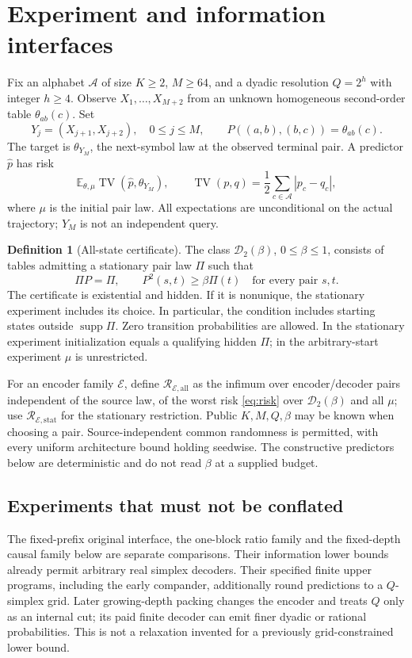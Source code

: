 \documentclass[11pt,letterpaper]{article}
\theoremstyle{definition}\newtheorem{definition}[theorem]{Definition}
\theoremstyle{remark}\newtheorem{remark}[theorem]{Remark}
\newcommand{\TV}{\operatorname{TV}}
\newcommand{\E}{\mathbb{E}}
\newcommand{\Risk}{\mathcal{R}}
\newcommand{\Dclass}{\mathcal{D}_2(\beta)}
\newcommand{\supp}{\operatorname{supp}}
\begin{document}
\section{Experiment and information interfaces}\label{sec:experiment}
Fix an alphabet $\mathcal A$ of size $K\ge2$, $M\ge64$, and a dyadic resolution $Q=2^h$ with integer $h\ge4$. Observe $X_1,\ldots,X_{M+2}$ from an unknown homogeneous second-order table $\theta_{ab}(c)$. Set
\[
 Y_j=(X_{j+1},X_{j+2}),\quad 0\le j\le M,
 \qquad P((a,b),(b,c))=\theta_{ab}(c).
\]
The target is $\theta_{Y_M}$, the next-symbol law at the observed terminal pair. A predictor $\widehat p$ has risk
\begin{equation}\label{eq:risk}
 \E_{\theta,\mu}\TV(\widehat p,\theta_{Y_M}),
 \qquad \TV(p,q)=\frac12\sum_{c\in\mathcal A}|p_c-q_c|,
\end{equation}
where $\mu$ is the initial pair law. All expectations are unconditional on the actual trajectory; $Y_M$ is not an independent query.

\begin{definition}[All-state certificate]
The class $\Dclass$, $0\le\beta\le1$, consists of tables admitting a stationary pair law $\Pi$ such that
\begin{equation}\label{eq:minor}
 \Pi P=\Pi,\qquad P^2(s,t)\ge\beta\Pi(t)\quad\text{for every pair }s,t.
\end{equation}
The certificate is existential and hidden. If it is nonunique, the stationary experiment includes its choice. In particular, the condition includes starting states outside $\supp\Pi$. Zero transition probabilities are allowed. In the stationary experiment initialization equals a qualifying hidden $\Pi$; in the arbitrary-start experiment $\mu$ is unrestricted.
\end{definition}

For an encoder family $\mathcal E$, define $\Risk_{\mathcal E,\mathrm{all}}$ as the infimum over encoder/decoder pairs independent of the source law, of the worst risk \eqref{eq:risk} over $\Dclass$ and all $\mu$; use $\Risk_{\mathcal E,\mathrm{stat}}$ for the stationary restriction. Public $K,M,Q,\beta$ may be known when choosing a pair. Source-independent common randomness is permitted, with every uniform architecture bound holding seedwise. The constructive predictors below are deterministic and do not read $\beta$ at a supplied budget.

\subsection{Experiments that must not be conflated}
The fixed-prefix original interface, the one-block ratio family and the fixed-depth causal family below are separate comparisons. Their information lower bounds already permit arbitrary real simplex decoders. Their specified finite upper programs, including the early compander, additionally round predictions to a $Q$-simplex grid. Later growing-depth packing changes the encoder and treats $Q$ only as an internal cut; its paid finite decoder can emit finer dyadic or rational probabilities. This is not a relaxation invented for a previously grid-constrained lower bound.
\end{document}
